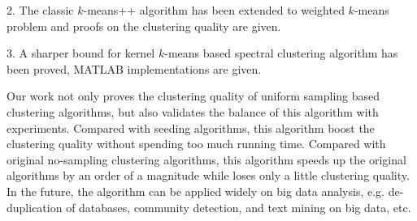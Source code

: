 \begin{englishabstract}
2. The classic $k$-means++ algorithm has been extended to weighted $k$-means problem and proofs on the clustering quality are given.

3. A sharper bound for kernel $k$-means based spectral clustering algorithm has been proved, MATLAB implementations are given.

Our work not only proves the clustering quality of uniform sampling based clustering algorithms, but also validates the balance of this algorithm with experiments. Compared with seeding algorithms, this algorithm boost the clustering quality without spending too much running time. Compared with original no-sampling clustering algorithms, this algorithm speeds up the original algorithms by an order of a magnitude while loses only a little clustering quality. In the future, the algorithm can be applied widely on big data analysis, e.g. de-duplication of databases, community detection, and text mining on big data, etc.

\end{englishabstract}



